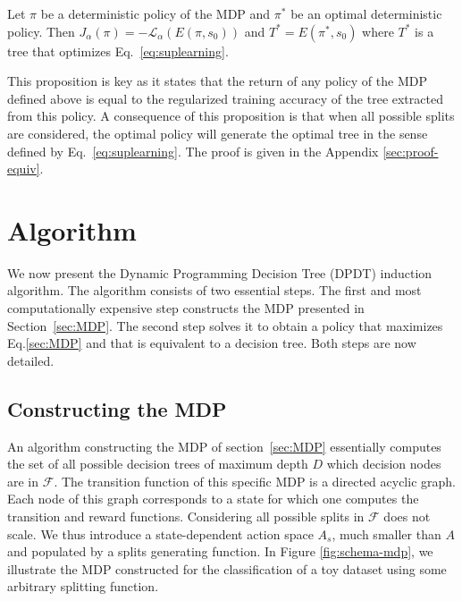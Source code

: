 \begin{proposition}\label{prop:equiv}
Let $\pi$ be a deterministic policy of the MDP and $\pi^*$ be an optimal deterministic policy. 
Then $J_\alpha(\pi) = -{\mathcal L}_\alpha(E(\pi, s_0))$ and $T^* = E(\pi^*, s_0)$ where $T^*$ is a tree that optimizes Eq.~\ref{eq:suplearning}.
\end{proposition}

This proposition is key as it states that the return of any policy of the MDP defined above is equal to the regularized training accuracy of the tree extracted from this policy. A consequence of this proposition is that when all possible splits are considered, the optimal policy will generate the optimal tree in the sense defined by Eq.~\eqref{eq:suplearning}. The proof is given in the Appendix \ref{sec:proof-equiv}.

\section{Algorithm}\label{sec:dpdt}

We now present the Dynamic Programming Decision Tree (DPDT) induction algorithm. 
The algorithm consists of two essential steps. The first and most computationally expensive step constructs the MDP presented in Section~\ref{sec:MDP}. 
The second step solves it to obtain a policy that maximizes Eq.\ref{sec:MDP} and that is equivalent to a decision tree. Both steps are now detailed.

\subsection{Constructing the MDP}

An algorithm constructing the MDP of section~\ref{sec:MDP} essentially computes the set of all possible decision trees of maximum depth $D$ which decision nodes are in $\mathcal F$. 
The transition function of this specific MDP is a directed acyclic graph. Each node of this graph corresponds to a state for which one computes the transition and reward functions. 
Considering all possible splits in $\mathcal F$ does not scale. We thus introduce a state-dependent action space $A_s$, much smaller than $A$ and populated by a splits generating function. In Figure \ref{fig:schema-mdp}, we illustrate the MDP constructed for the classification of a toy dataset using some arbitrary splitting function.

